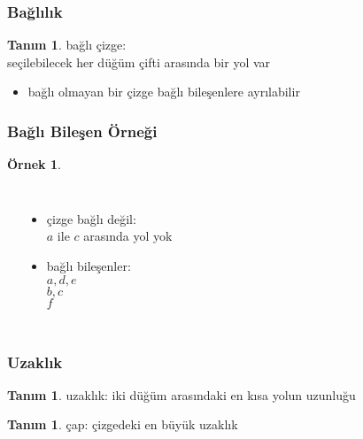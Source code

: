 \documentclass[dvipsnames]{beamer}
\theoremstyle{definition}
\newtheorem{tanim}[theorem]{Tanım}
\theoremstyle{example}
\newtheorem{ornek}[theorem]{Örnek}
\theoremstyle{plain}
\begin{document}
\begin{frame}
  \frametitle{Bağlılık}

  \begin{tanim}
    \alert{bağlı çizge}:\\
    seçilebilecek her düğüm çifti arasında bir yol var
  \end{tanim}

  \pause
  \begin{itemize}
    \item bağlı olmayan bir çizge bağlı bileşenlere ayrılabilir
  \end{itemize}
\end{frame}

\begin{frame}
  \frametitle{Bağlı Bileşen Örneği}

  \begin{ornek}
    \begin{columns}
      \begin{center}
      \end{center}

      \pause
      \begin{itemize}
        \item çizge bağlı değil:\\
          $a$ ile $c$ arasında yol yok
        \item bağlı bileşenler:\\
          $a,d,e$\\
          $b,c$\\
          $f$
      \end{itemize}
    \end{columns}
  \end{ornek}
\end{frame}

\begin{frame}
  \frametitle{Uzaklık}

  \begin{tanim}
    \alert{uzaklık}: iki düğüm arasındaki en kısa yolun uzunluğu
  \end{tanim}

  \pause
  \begin{tanim}
    \alert{çap}: çizgedeki en büyük uzaklık
  \end{tanim}
\end{frame}
\end{document}
